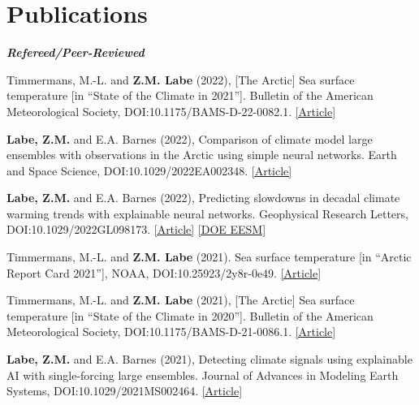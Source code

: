 \documentclass[margin,line,palatino,courier,10pt]{res}
\begin{document}
\begin{resume}
\vspace{-0.1in}
\noindent\textcolor{Cerulean}{\makebox[\linewidth][r]{\rule{\textwidth}{5pt}}}
\vspace{-0.3in}

\section{\sc \large{\textcolor{Cerulean}{\textbf{Publications}}}} 
\textit{\textbf{Refereed/Peer-Reviewed}}
\vspace*{-0.1in}\\
\begin{etaremune}[leftmargin=0in,topsep=0in,parsep=0in]
\item Timmermans, M.-L. and \textbf{Z.M. Labe} (2022), [The Arctic] Sea surface temperature [in ``State of the Climate in 2021'']. Bulletin of the American Meteorological Society, DOI:10.1175/BAMS-D-22-0082.1. \href{https://doi.org/10.1175/BAMS-D-22-0082.1}{[Article]}
\item \textbf{Labe, Z.M.} and E.A. Barnes (2022), Comparison of climate model large ensembles with observations in the Arctic using simple neural networks. Earth and Space Science, DOI:10.1029/2022EA002348. \href{https://doi.org/10.1029/2022EA002348}{[Article]}
\item \textbf{Labe, Z.M.} and E.A. Barnes (2022), Predicting slowdowns in decadal climate warming trends with explainable neural networks. Geophysical Research Letters, DOI:10.1029/2022GL098173. \href{https://doi.org/10.1029/2022GL098173}{[Article]} \href{https://climatemodeling.science.energy.gov/research-highlights/predicting-slowdowns-decadal-climate-warming-trends-explainable-neural-networks}{[DOE EESM]}
\item Timmermans, M.-L. and \textbf{Z.M. Labe} (2021). Sea surface temperature [in ``Arctic Report Card 2021''], NOAA, DOI:10.25923/2y8r-0e49. \href{https://www.arctic.noaa.gov/Report-Card/Report-Card-2021/ArtMID/8022/ArticleID/944/Sea-Surface-Temperature}{[Article]}
\item Timmermans, M.-L. and \textbf{Z.M. Labe} (2021), [The Arctic] Sea surface temperature [in ``State of the Climate in 2020'']. Bulletin of the American Meteorological Society, DOI:10.1175/BAMS-D-21-0086.1. \href{https://doi.org/10.1175/BAMS-D-21-0086.1}{[Article]}
\item \textbf{Labe, Z.M.} and E.A. Barnes (2021), Detecting climate signals using explainable AI with single-forcing large ensembles. Journal of Advances in Modeling Earth Systems, DOI:10.1029/2021MS002464. \href{https://agupubs.onlinelibrary.wiley.com/doi/abs/10.1029/2021MS002464}{[Article]}

\end{etaremune}
\end{resume}
\end{document}

